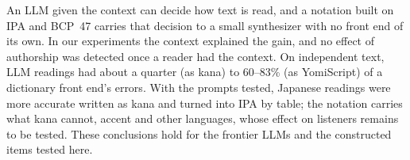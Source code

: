 \documentclass{Interspeech}
\begin{document}
An LLM given the context can decide how text is read, and a notation built on IPA and BCP~47 carries that decision to
a small synthesizer with no front end of its own. In our experiments the context explained the gain, and no
effect of authorship was detected once a reader had the context. On independent text, LLM readings had about a quarter (as kana) to 60--83\% (as YomiScript) of a dictionary
front end's errors. With the prompts tested, Japanese readings were more accurate written as kana and turned into IPA by table; the notation
carries what kana cannot, accent and other languages, whose effect on listeners remains to be tested. These
conclusions hold for the frontier LLMs and the constructed items tested here.



\end{document}
